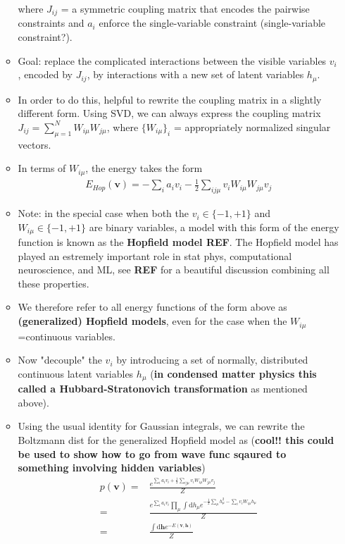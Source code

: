 \documentclass[norsk,a4paper,11pt]{article}
\begin{document}
\begin{itemize}
\begin{itemize}
		where $J_{ij}$ = a symmetric coupling matrix that encodes the pairwise constraints and $a_i$ enforce the single-variable constraint (single-variable constraint?).
		\item Goal: replace the complicated interactions between the visible variables $v_i$, encoded by $J_{ij}$, by interactions with a new set of latent variables $h_\mu$. 
		\item In order to do this, helpful to rewrite the coupling matrix in a slightly different form. Using SVD, we can always express the coupling matrix $J_{ij} = \sum_{\mu=1}^N W_{i\mu} W_{j\mu}$, where $\{ W_{i\mu} \}_i$ = appropriately normalized singular vectors.
		\item In terms of $W_{i\mu}$, the energy takes the form
		\begin{align}
			E_{Hop} (\bm{v}) = - \sum_i a_i v_i -\frac{1}{2} \sum_{ij\mu} v_i W_{i\mu} W_{j\mu} v_j
		\end{align}
		\item Note: in the special case when both the $v_i \in \{ -1, +1 \}$ and $W_{i\mu} \in \{ -1, +1 \}$ are binary variables, a model with this form of the energy function is known as the \textbf{Hopfield model REF}. The Hopfield model has played an estremely important role in stat phys, computational neuroscience, and ML, see \textbf{REF} for a beautiful discussion combining all  these properties.
		\item We therefore refer to all energy functions of the form above as \textbf{(generalized) Hopfield models}, even for the case when the $W_{i\mu}$=continuous variables.
		\item Now "decouple" the $v_i$ by introducing a set of normally, distributed continuous latent variables $h_\mu$ (\textbf{in condensed matter physics this called a Hubbard-Stratonovich transformation} as mentioned above). 
		\item Using the usual identity for Gaussian integrals, we can rewrite the Boltzmann dist for the generalized Hopfield model as (\textbf{cool!! this could be used to show how to go from wave func sqaured to something involving hidden variables})
		\begin{align}
			p(\bm{v}) =& \frac{e^{\sum_i a_i v_i +\frac{1}{2} \sum_{ij\mu} v_i W_{i\mu} W_{j\mu} v_j}}{Z} \\
			=& \frac{e^{\sum_i a_i v_i} \prod_\mu \int \text{d} h_\mu e^{- \frac{1}{2}\sum_\mu h_\mu^2 - \sum_i v_i W_{i\mu} h_\mu}}{Z} \\
			=& \frac{\int \text{d}\bm{h} e^{-E(\bm{v}, \bm{h})}}{Z}

\end{align}
\end{itemize}
\end{itemize}
\end{document}
